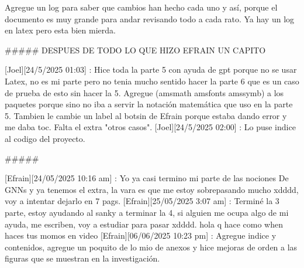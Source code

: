 Agregue un log para saber que cambios han hecho cada uno y así, porque el documento es muy grande para andar revisando todo a cada rato. Ya hay un log en latex pero esta bien mierda.

#####
DESPUES DE TODO LO QUE HIZO EFRAIN UN CAPITO

[Joel][24/5/2025 01:03] : Hice toda la parte 5 con ayuda de gpt porque no se usar Latex, no es mi parte pero no tenia mucho sentido hacer la parte 6 que es un caso de prueba de esto sin hacer la 5. Agregue ({amsmath} {amsfonts} {amssymb}) a los paquetes porque sino no iba a servir la notación matemática que uso en la parte 5. Tambien le cambie un label al botsin de Efrain porque estaba dando error y me daba toc. Falta el extra "otros casos".
[Joel][24/5/2025 02:00] : Lo puse indice al codigo del proyecto.

#####

[Efrain][24/05/2025 10:16 am] : Yo ya casi termino mi parte de las nociones De GNNs y ya tenemos el extra, la vara es que me estoy sobrepasando mucho xdddd, voy a intentar dejarlo en 7 pags.
[Efrain][25/05/2025 3:07 am] : Terminé la 3 parte, estoy ayudando al sanky a terminar la 4, si alguien me ocupa algo de mi ayuda, me escriben, voy a estudiar para pasar xdddd.
hola q hace
como when haces tus momos en video
[Efrain][06/06/2025 10:23 pm] : Agregue indice y contenidos, agregue un poquito de lo mio de anexos y hice mejoras de orden a las figuras que se muestran en la investigación.